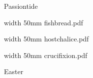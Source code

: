 \paginaproxima


\paginaproxima

\beginpart Passiontide


\bigskip

\paginaproxima


\bigskip



\eject


\bigskip

\saveimageresource width 50mm {fishbread.pdf}

\centerline{\useimageresource \lastsavedimageresourceindex}



\bigskip

\eject


\bigskip

\saveimageresource width 50mm {hostchalice.pdf}

\centerline{\useimageresource \lastsavedimageresourceindex}



\bigskip

\eject


\paginaproxima


\bigskip

\saveimageresource width 50mm {crucifixion.pdf}

\centerline{\useimageresource \lastsavedimageresourceindex}



\bigskip

\eject

\beginpart Easter


\bigskip

